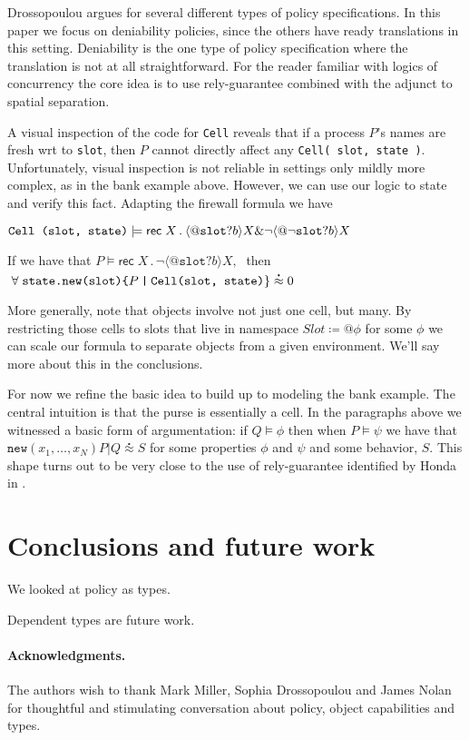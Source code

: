 \documentclass[]{amsart}
\makeatletter
\newcommand{\id}[1]{\texttt{#1}}
\newcommand{\juxtap}{\mathbin{\id{|}}}
\newcommand{\binpar}[2]{#1 \juxtap #2}
\newcommand{\quotep}[1]{@#1}
\newcommand{\defneqls}{\coloneqq}
\newcommand{\wbbisim}{\stackrel{\centerdot}{\approx}} %
\newcommand{\pprefix}[3]{\langle #1 ? #2 \rangle #3}
\newcommand{\pgfp}[2]{\textsf{rec} \; #1 \mathbin{.} #2}
\theoremstyle{definition}
\theoremstyle{remark}
\numberwithin{equation}{subsection}
\makeatother
\begin{document}
Drossopoulou \cite{Drossopoulou} argues for several different types of policy
specifications. In this paper we focus on deniability policies, since the
others have ready translations in this setting. Deniability is the one
type of policy specification where the translation is not at all
straightforward. For the reader familiar with logics of concurrency the
core idea is to use rely-guarantee combined with the adjunct to
spatial separation.

A visual inspection of the code for {\tt Cell} reveals that if a
process $P$’s names are fresh wrt to {\tt slot}, then $P$ cannot
directly affect any {\tt Cell( slot, state )}. Unfortunately, 
visual inspection is not reliable in settings only mildly more 
complex, as in the bank example above. However, we can use our 
logic to state and verify this fact. Adapting the firewall formula 
we have

$\mbox{\tt Cell (slot, state)} \models 
\pgfp{X}{\pprefix{\quotep{\texttt{slot}}}{b}{X} \& 
\neg \pprefix{\quotep{\neg \texttt{slot}}}{b}{X}}$

If we have that $P \models \pgfp{X}{\neg
  \pprefix{\quotep{\texttt{slot}}}{b}{X}}, \;$ then
$\; \forall \; \mbox{\tt state.new(slot)\{}
\binpar{P}{\mbox{\tt Cell(slot, state)}}{\tt \}} \wbbisim 0$

More generally, note that objects involve not just one cell, but
many. By restricting those cells to slots that live in namespace $Slot
\defneqls {@}\phi$ for some $\phi$ we can scale our formula to
separate objects from a given environment. We'll say more about this
in the conclusions. 

For now we refine the basic idea to build up to modeling the bank
example. The central intuition is that the purse is essentially a
cell. In the paragraphs above we witnessed a basic form of argumentation: if $Q
\models \phi$ then when $P \models \psi$ we have that
$\texttt{new}(x_1,\ldots,x_N)\binpar{P}{Q} \wbbisim S$ for some properties
$\phi$ and $\psi$ and some behavior, $S$. This shape turns out to be
very close to the use of rely-guarantee identified by Honda in
\cite{HondoRG}.

\section{Conclusions and future work}

We looked at policy as types.

Dependent types are future work.

\paragraph{Acknowledgments.}
The authors wish to thank Mark Miller, Sophia Drossopoulou and James Nolan for
thoughtful and stimulating conversation about policy, object
capabilities and types.
\end{document}

